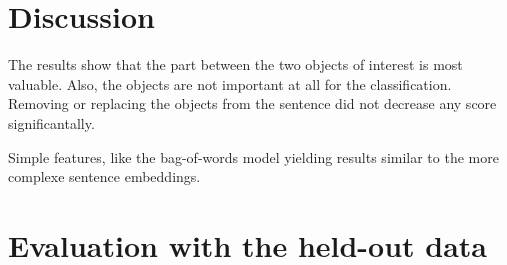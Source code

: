 \section{Discussion}
The results show that the part between the two objects of interest is most valuable. Also, the objects are not important at all for the classification. Removing or replacing the objects from the sentence did not decrease any score significantally.

Simple features, like the bag-of-words model yielding results similar to the more complexe sentence embeddings.

\section{Evaluation with the held-out data}
\label{sec:final}

